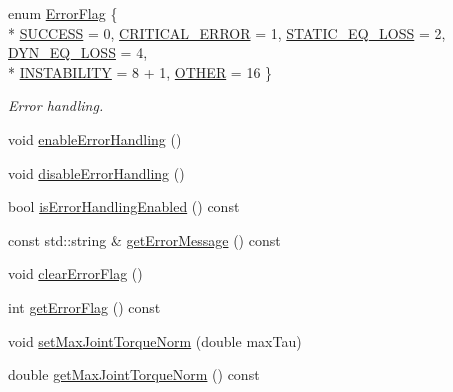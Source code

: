 \begin{DoxyCompactItemize}
\item 
enum \hyperlink{classocra_1_1Controller_abeaf3673abe2da79493638dcc49fcf6e}{Error\+Flag} \{ \\*
\hyperlink{classocra_1_1Controller_abeaf3673abe2da79493638dcc49fcf6eaf0c456fccd7111235e41d752e78d4e3d}{S\+U\+C\+C\+E\+SS} = 0, 
\hyperlink{classocra_1_1Controller_abeaf3673abe2da79493638dcc49fcf6eaa6ea1ed92f7f3f1278fb8bbf11a13d77}{C\+R\+I\+T\+I\+C\+A\+L\+\_\+\+E\+R\+R\+OR} = 1, 
\hyperlink{classocra_1_1Controller_abeaf3673abe2da79493638dcc49fcf6ea2c4995e7abb68ab3a51e2052609d0f46}{S\+T\+A\+T\+I\+C\+\_\+\+E\+Q\+\_\+\+L\+O\+SS} = 2, 
\hyperlink{classocra_1_1Controller_abeaf3673abe2da79493638dcc49fcf6eadb8ddca8cd6373851537d1c719f04c97}{D\+Y\+N\+\_\+\+E\+Q\+\_\+\+L\+O\+SS} = 4, 
\\*
\hyperlink{classocra_1_1Controller_abeaf3673abe2da79493638dcc49fcf6ea7dc3bcb2de72c9d94bdee2a99f5957d4}{I\+N\+S\+T\+A\+B\+I\+L\+I\+TY} = 8 + 1, 
\hyperlink{classocra_1_1Controller_abeaf3673abe2da79493638dcc49fcf6ea2a5f1f9e553eccf1b3f1a26c5979c0ef}{O\+T\+H\+ER} = 16
 \}\begin{DoxyCompactList}\small\item\em Error handling. \end{DoxyCompactList}
\item 
void \hyperlink{classocra_1_1Controller_a9f9773f34022d6f7b0abf95255088f70}{enable\+Error\+Handling} ()
\item 
void \hyperlink{classocra_1_1Controller_aad44e0db3e0039bf3d6eeb3a89a99752}{disable\+Error\+Handling} ()
\item 
bool \hyperlink{classocra_1_1Controller_af8fbf668cbe9944cd947e617ce992ea9}{is\+Error\+Handling\+Enabled} () const 
\item 
const std\+::string \& \hyperlink{classocra_1_1Controller_abcc464803f11d3f69c128e8e36aa0d1d}{get\+Error\+Message} () const 
\item 
void \hyperlink{classocra_1_1Controller_a18fe6c4ad06aa7b2254ab6e4e740d101}{clear\+Error\+Flag} ()
\item 
int \hyperlink{classocra_1_1Controller_a99f9c290350b5457f77611ec4fe83cef}{get\+Error\+Flag} () const 
\item 
void \hyperlink{classocra_1_1Controller_a80f0b90e59759bf79fc4ff8c85ca8d85}{set\+Max\+Joint\+Torque\+Norm} (double max\+Tau)
\item 
double \hyperlink{classocra_1_1Controller_a4c374a5467f865843a3d43cb1bd4b219}{get\+Max\+Joint\+Torque\+Norm} () const 

\end{DoxyCompactItemize}
